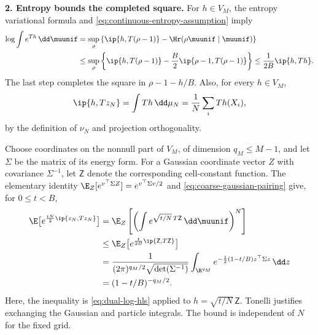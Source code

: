 \textbf{2. Entropy bounds the completed square.}
For $h\in V_M$, the entropy variational formula and \eqref{eq:continuous-entropy-assumption} imply
\begin{equation}
 \begin{aligned}
 \log\int e^{Th}\,\dd\muunif
 &=\sup_\rho\left\{\ip{h,T(\rho-1)}-\Hr(\rho\muunif\mid\muunif)\right\}\\
 &\le\sup_\rho\left\{\ip{h,T(\rho-1)}
                         -\frac B2\ip{\rho-1,T(\rho-1)}\right\}
 \le\frac1{2B}\ip{h,Th}.
 \end{aligned}
 \label{eq:dual-log-hls}
\end{equation}
The last step completes the square in $\rho-1-h/B$.  Also, for every $h\in V_M$,
\begin{equation}
 \ip{h,Tz_N}=\int Th\,\dd\mu_N
            =\frac1N\sum_iTh(X_i),
 \label{eq:coarse-gaussian-pairing}
\end{equation}
by the definition of $\nu_N$ and projection orthogonality.

Choose coordinates on the nonnull part of $V_M$, of dimension $q_M\le M-1$, and let $\Sigma$ be the matrix of its energy form.  For a Gaussian coordinate vector $Z$ with covariance $\Sigma^{-1}$, let $\mathsf Z$ denote the corresponding cell-constant function.  The elementary identity
$\E_Z[e^{v^\top\Sigma Z}]=e^{v^\top\Sigma v/2}$ and \eqref{eq:coarse-gaussian-pairing} give, for $0\le t<B$,
\begin{equation}
 \begin{aligned}
 \E\big[e^{\frac{tN}2\ip{z_N,Tz_N}}\big]
 &=\E_Z\left[\left(\int e^{\sqrt{t/N}\,T\mathsf Z}
                           \,\dd\muunif\right)^N\right]\\
 &\le\E_Z\big[e^{\frac{t}{2B}\ip{\mathsf Z,T\mathsf Z}}\big]\\
 &=\frac1{(2\pi)^{q_M/2}\sqrt{\det(\Sigma^{-1})}}
   \int_{\R^{q_M}}e^{-\frac12(1-t/B)z^\top\Sigma z}\,\dd z\\
 &=(1-t/B)^{-q_M/2}.
 \end{aligned}
 \label{eq:coarse-partition-estimate}
\end{equation}
Here, the inequality is \eqref{eq:dual-log-hls} applied to
$h=\sqrt{t/N}\,\mathsf Z$.  Tonelli justifies exchanging the Gaussian and particle integrals.  The bound is independent of $N$ for the fixed grid.


